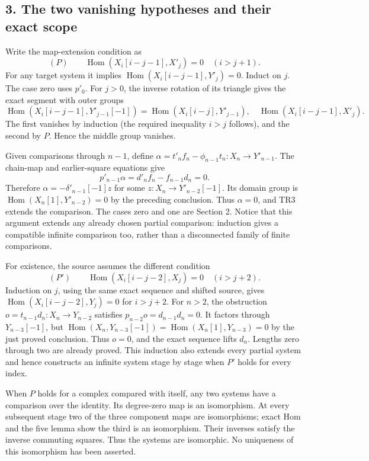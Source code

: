 \subsection{3. The two vanishing hypotheses and their exact scope}\label{proofs-12008-12370-the-two-vanishing-hypotheses-and-their-exact-scope}

Write the map-extension condition as \[
(P)\qquad \operatorname{Hom}(X_i[i-j-1],X'_j)=0
 \quad(i>j+1).
\] For any target system it implies \(\operatorname{Hom}(X_i[i-j-1],Y'_j)=0\). Induct on \(j\). The case zero uses \(p'_0\). For \(j>0\),\allowbreak{} the inverse rotation of its triangle gives the exact segment with outer groups \[
\operatorname{Hom}(X_i[i-j-1],Y'_{j-1}[-1])
 =\operatorname{Hom}(X_i[i-j],Y'_{j-1}),\quad
\operatorname{Hom}(X_i[i-j-1],X'_j).
\] The first vanishes by induction (the required inequality \(i>j\) follows)\allowbreak{},\allowbreak{} and the second by \(P\). Hence the middle group vanishes.

Given comparisons through \(n-1\),\allowbreak{} define \(\alpha=t'_nf_n-\phi_{n-1}t_n:X_n\to Y'_{n-1}\). The chain-map and earlier-square equations give \[
p'_{n-1}\alpha=d'_nf_n-f_{n-1}d_n=0.
\] Therefore \(\alpha=-\delta'_{n-1}[-1]z\) for some \(z:X_n\to Y'_{n-2}[-1]\). Its domain group is \(\operatorname{Hom}(X_n[1],Y'_{n-2})=0\) by the preceding conclusion. Thus \(\alpha=0\),\allowbreak{} and TR3 extends the comparison. The cases zero and one are Section 2. Notice that this argument extends any already chosen partial comparison:\allowbreak{} induction gives a compatible infinite comparison too,\allowbreak{} rather than a disconnected family of finite comparisons.

For existence,\allowbreak{} the source assumes the different condition \[
(P')\qquad \operatorname{Hom}(X_i[i-j-2],X_j)=0
 \quad(i>j+2).
\] Induction on \(j\),\allowbreak{} using the same exact sequence and shifted source,\allowbreak{} gives \(\operatorname{Hom}(X_i[i-j-2],Y_j)=0\) for \(i>j+2\). For \(n>2\),\allowbreak{} the obstruction \(o=t_{n-1}d_n:X_n\to Y_{n-2}\) satisfies \(p_{n-2}o=d_{n-1}d_n=0\). It factors through \(Y_{n-3}[-1]\),\allowbreak{} but \(\operatorname{Hom}(X_n,Y_{n-3}[-1])
 =\operatorname{Hom}(X_n[1],Y_{n-3})=0\) by the just proved conclusion. Thus \(o=0\),\allowbreak{} and the exact sequence lifts \(d_n\). Lengths zero through two are already proved. This induction also extends every partial system and hence constructs an infinite system stage by stage when \(P'\) holds for every index.

When \(P\) holds for a complex compared with itself,\allowbreak{} any two systems have a comparison over the identity. Its degree-zero map is an isomorphism. At every subsequent stage two of the three component maps are isomorphisms; exact Hom and the five lemma show the third is an isomorphism. Their inverses satisfy the inverse commuting squares. Thus the systems are isomorphic. No uniqueness of this isomorphism has been asserted.


